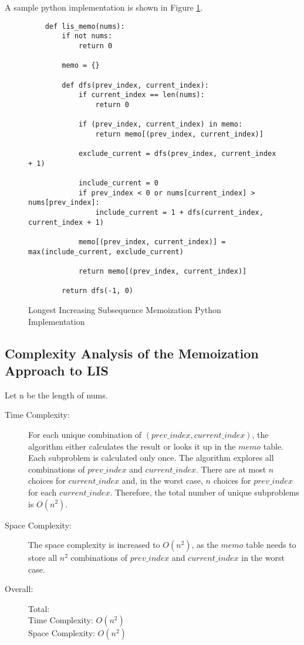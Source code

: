 A sample python implementation is shown in Figure \ref{fig:lis-memo}.

\begin{figure}[H]
    \centering
    \begin{lstlisting}
    def lis_memo(nums):
        if not nums:
            return 0
    
        memo = {}
    
        def dfs(prev_index, current_index):
            if current_index == len(nums):
                return 0
    
            if (prev_index, current_index) in memo:
                return memo[(prev_index, current_index)]
            
            exclude_current = dfs(prev_index, current_index + 1)
    
            include_current = 0
            if prev_index < 0 or nums[current_index] > nums[prev_index]:
                include_current = 1 + dfs(current_index, current_index + 1)
    
            memo[(prev_index, current_index)] = max(include_current, exclude_current)
    
            return memo[(prev_index, current_index)]
    
        return dfs(-1, 0)
    \end{lstlisting}
    \caption{Longest Increasing Subsequence Memoization Python Implementation}
    \label{fig:lis-memo}
\end{figure}

\subsection{Complexity Analysis of the Memoization Approach to LIS}
Let n be the length of nums.
\begin{description}
    \item[Time Complexity:]
        For each unique combination of $(prev\_index, current\_index)$, the algorithm either calculates the result or looks it up in the $memo$ table.
        Each subproblem is calculated only once.
        The algorithm explores all combinations of $prev\_index$ and $current\_index$.
        There are at most $n$ choices for $current\_index$ and,
        in the worst case, $n$ choices for $prev\_index$ for each $current\_index$.
        Therefore, the total number of unique subproblems is $O(n^2)$.
        
    \item[Space Complexity:] 
        The space complexity is increased to $O(n^2)$,
        as the $memo$ table needs to store all $n^2$ combinations of $prev\_index$ and $current\_index$ in the worst case.
        
        
    \item[Overall:] Total:\\
        Time Complexity: $O(n^2)$\\
        Space Complexity: $O(n^2)$
    
\end{description}

